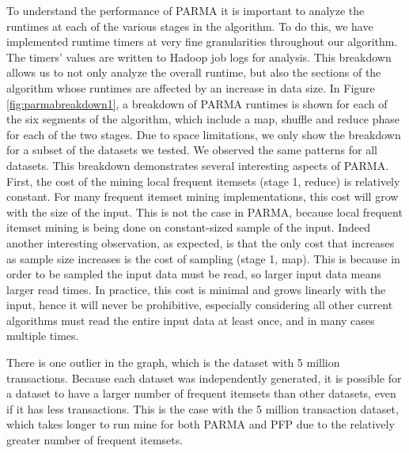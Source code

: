 To understand the performance of PARMA it is important to analyze the
runtimes at each of the various stages in the algorithm. To do this, we
have implemented runtime timers at very fine granularities throughout
our algorithm. The timers' values are written to Hadoop job logs for
analysis. This breakdown allows us to not only analyze the overall
runtime, but also the sections of the algorithm whose runtimes are
affected by an increase in data size. In Figure \ref{fig:parmabreakdown1}, a
breakdown of PARMA runtimes is shown for each of the six segments of the
algorithm, which include a map, shuffle and reduce phase for each of the
two stages. 
Due to space limitations, we only show the breakdown for a subset of
the datasets we tested. We observed the same patterns for all datasets.
This breakdown demonstrates several interesting aspects of
PARMA. First, the cost of the mining local frequent itemsets (stage 1,
reduce) is relatively constant. For many frequent itemset mining
implementations, this cost will grow with the size of the input. This is
not the case in PARMA, because local frequent itemset mining is being
done on constant-sized sample of the input. Indeed another interesting
observation, as expected, is that the only cost that increases as sample
size increases is the cost of sampling (stage 1, map). This is because
in order to be sampled the input data must be read, so larger input data
means larger read times. In practice, this cost is minimal and
grows linearly with the input, hence it will never be prohibitive,
especially considering all other current algorithms must read the entire
input data at least once, and in many cases multiple times. 

There is one outlier in the graph, which is the dataset with 5 million
transactions. Because each dataset was independently generated, it is
possible for a dataset to have a larger number of frequent itemsets than
other datasets, even if it has less transactions. This is the case with
the 5 million transaction dataset, which takes longer to run mine for both PARMA and PFP
due to the relatively greater number of frequent itemsets. 

